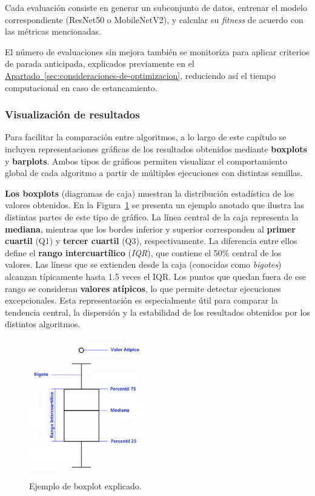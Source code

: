 Cada evaluación consiste en generar un subconjunto de datos, entrenar el modelo correspondiente (ResNet50 o MobileNetV2),
y calcular su \textit{fitness} de acuerdo con las métricas mencionadas.

El número de evaluaciones sin mejora también se monitoriza para aplicar criterios de parada anticipada,
explicados previamente en el \hyperref[sec:consideraciones-de-optimizacion]{Apartado~\ref*{sec:consideraciones-de-optimizacion}},
reduciendo así el tiempo computacional en caso de estancamiento.

\subsubsection{Visualización de resultados}\label{subsec:visualizacion-de-resultados}
Para facilitar la comparación entre algoritmos, a lo largo de este capítulo se incluyen representaciones gráficas de los
resultados obtenidos mediante \textbf{boxplots} y \textbf{barplots}.
Ambos tipos de gráficos permiten visualizar el comportamiento global de cada algoritmo a partir de múltiples ejecuciones con distintas semillas.

\textbf{Los boxplots} (diagramas de caja) muestran la distribución estadística de los valores obtenidos.
En la Figura~\ref{fig:boxplot-explicado} se presenta un ejemplo anotado que ilustra las distintas partes de este tipo de gráfico.
La línea central de la caja representa la \textbf{mediana},
mientras que los bordes inferior y superior corresponden al \textbf{primer cuartil} (Q1) y \textbf{tercer cuartil} (Q3), respectivamente.
La diferencia entre ellos define el \textbf{rango intercuartílico} (\textit{IQR}), que contiene el 50\% central de los valores.
Las líneas que se extienden desde la caja (conocidas como \textit{bigotes}) alcanzan típicamente hasta 1.5 veces el IQR.
Los puntos que quedan fuera de ese rango se consideran \textbf{valores atípicos}, lo que permite detectar ejecuciones excepcionales.
Esta representación es especialmente útil para comparar la tendencia central, la dispersión y la estabilidad de los resultados obtenidos por los distintos algoritmos.

\begin{figure}[H]
    \centering
    \includegraphics[width=0.45\textwidth]{imagenes/boxplot-explicado}
    \caption{Ejemplo de boxplot explicado.}
    \label{fig:boxplot-explicado}
\end{figure}

